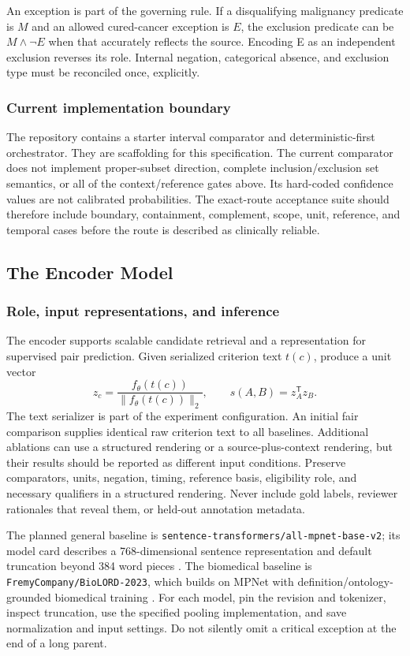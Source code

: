 \documentclass[10pt,letterpaper]{article}
\newcommand{\pathcode}[1]{\nolinkurl{#1}}
\begin{document}
An exception is part of the governing rule. If a disqualifying malignancy
predicate is $M$ and an allowed cured-cancer exception is $E$, the exclusion
predicate can be $M\land\neg E$ when that accurately reflects the source.
Encoding E as an independent exclusion reverses its role. Internal negation,
categorical absence, and exclusion type must be reconciled once, explicitly.

\subsubsection{Current implementation boundary}
The repository contains a starter interval comparator and deterministic-first
orchestrator. They are scaffolding for this specification. The current
comparator does not implement proper-subset direction, complete
inclusion/exclusion set semantics, or all of the context/reference gates
above. Its hard-coded confidence values are not calibrated probabilities.
The exact-route acceptance suite should therefore include boundary,
containment, complement, scope, unit, reference, and temporal cases before
the route is described as clinically reliable.

\subsection{The Encoder Model}
\label{sec:encoder}

\subsubsection{Role, input representations, and inference}
The encoder supports scalable candidate retrieval and a representation for
supervised pair prediction. Given serialized criterion text $t(c)$, produce
a unit vector
\[
 z_c=\frac{f_{\theta}(t(c))}{\|f_{\theta}(t(c))\|_2},\qquad
 s(A,B)=z_A^{\mathsf T}z_B.
\]
The text serializer is part of the experiment configuration. An initial fair
comparison supplies identical raw criterion text to all baselines. Additional
ablations can use a structured rendering or a source-plus-context rendering,
but their results should be reported as different input conditions. Preserve
comparators, units, negation, timing, reference basis, eligibility role, and
necessary qualifiers in a structured rendering. Never include gold labels,
reviewer rationales that reveal them, or held-out annotation metadata.

The planned general baseline is
\pathcode{sentence-transformers/all-mpnet-base-v2}; its model card describes
a 768-dimensional sentence representation and default truncation beyond 384
word pieces \cite{mpnet}. The biomedical baseline is
\pathcode{FremyCompany/BioLORD-2023}, which builds on MPNet with
definition/ontology-grounded biomedical training \cite{biolord}.
For each model, pin the revision and tokenizer, inspect truncation, use the
specified pooling implementation, and save normalization and input settings.
Do not silently omit a critical exception at the end of a long parent.
\end{document}
